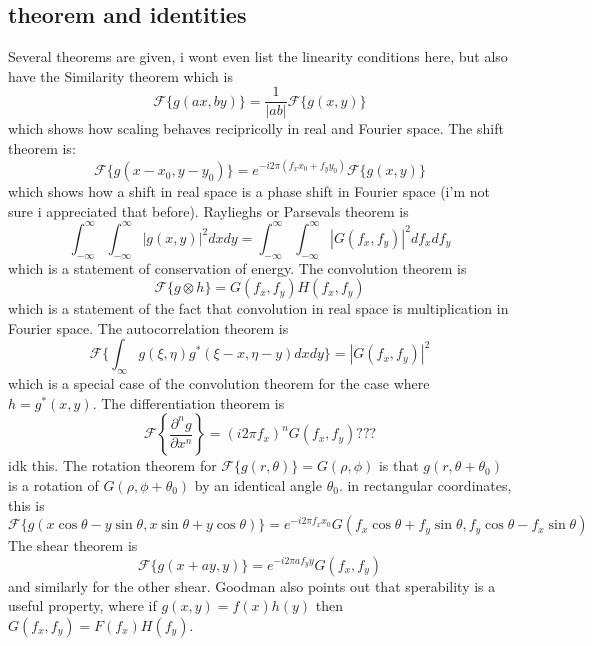 \documentclass[../../main.tex]{subfiles}
\begin{document}
\subsection{theorem and identities}
Several theorems are given, i wont even list the linearity conditions here, but also have the Similarity theorem which is 
\begin{equation}\label{eq. similarity theorem}
    \mathcal{F}\{g(ax,by)\}=\frac{1}{|ab|}\mathcal{F}\{g(x,y)\}
\end{equation}
which shows how scaling behaves recipricolly in real and Fourier space. The shift theorem is:
\begin{equation}\label{eq. shift theorem}
    \mathcal{F}\{g(x-x_0,y-y_0)\}=e^{-i2\pi(f_xx_0+f_yy_0)}\mathcal{F}\{g(x,y)\}
\end{equation}
which shows how a shift in real space is a phase shift in Fourier space (i'm not sure i appreciated that before). Raylieghs or Parsevals theorem is
\begin{equation}\label{eq. Rayleighs theorem}
    \int_{-\infty}^{\infty}\int_{-\infty}^{\infty}|g(x,y)|^2dxdy=\int_{-\infty}^{\infty}\int_{-\infty}^{\infty}|G(f_x,f_y)|^2df_xdf_y
\end{equation}
which is a statement of conservation of energy. The convolution theorem is
\begin{equation}\label{eq. convolution theorem}
    \mathcal{F}\{g\otimes h\}=G(f_x,f_y)H(f_x,f_y)
\end{equation}
which is a statement of the fact that convolution in real space is multiplication in Fourier space. The autocorrelation theorem is
\begin{equation}\label{eq. autocorrelation theorem}
    \mathcal{F}\{\int_{\infty} g(\xi,\eta)g^*(\xi-x,\eta-y)dxdy\}=|G(f_x,f_y)|^2
\end{equation}
which is a special case of the convolution theorem for the case where $h=g^*(x,y)$. The differentiation theorem is
\begin{equation}\label{eq. differentiation theorem}
    \mathcal{F}\left\{\frac{\partial^ng}{\partial x^n}\right\}=(i2\pi f_x)^nG(f_x,f_y) ? ? ?
\end{equation}
idk this. 
The rotation theorem for $\mathcal{F}\{g(r,\theta)\}=G(\rho,\phi)$ is that $g(r,\theta+\theta_0)$ is a rotation of $G(\rho,\phi+\theta_0)$ by an identical angle $\theta_0$. in rectangular coordinates, this is
\begin{equation}\label{eq. rotation theorem}
    \mathcal{F}\{g(x\cos\theta-y\sin\theta,x\sin\theta+y\cos\theta)\}=e^{-i2\pi f_x x_0}G(f_x\cos\theta+f_y\sin\theta,f_y\cos\theta-f_x\sin\theta)
\end{equation}
The shear theorem is
\begin{equation}\label{eq. shear theorem}
    \mathcal{F}\{g(x+ay,y)\}=e^{-i2\pi af_yy}G(f_x,f_y)
\end{equation}
and similarly for the other shear. Goodman also points out that sperability is a useful property, where if $g(x,y)=f(x)h(y)$ then $G(f_x,f_y)=F(f_x)H(f_y)$.
\end{document}
